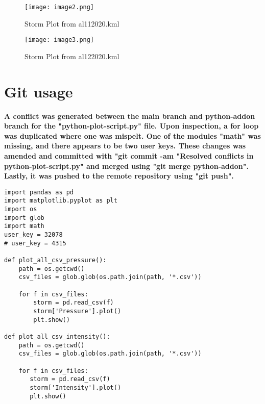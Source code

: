 \documentclass[]{article}
\begin{document}
\newpage

\begin{figure}[!h]
  \centering
  \texttt{[image: image2.png]}
  \caption{Storm Plot from al112020.kml}
  \label{fig:myimage}
\end{figure}

\begin{figure}[!h]
  \centering
  \texttt{[image: image3.png]}
  \caption{Storm Plot from al122020.kml}
  \label{fig:myimage}
\end{figure}

\newpage

\section{Git usage}

\textbf{A conflict was generated between the main branch and python-addon branch for the "python-plot-script.py" file. Upon inspection, a for loop was duplicated where one was mispelt. One of the modules "math" was missing, and there appears to be two user keys. These changes was amended and committed with "git commit -am "Resolved conflicts in python-plot-script.py" and merged using "git merge python-addon". Lastly, it was pushed to the remote repository using "git push".}

\begin{verbatim}
import pandas as pd
import matplotlib.pyplot as plt
import os
import glob
import math
user_key = 32078
# user_key = 4315

def plot_all_csv_pressure():
    path = os.getcwd()
    csv_files = glob.glob(os.path.join(path, '*.csv'))

    for f in csv_files:
        storm = pd.read_csv(f)
        storm['Pressure'].plot()
        plt.show()

def plot_all_csv_intensity():
    path = os.getcwd()
    csv_files = glob.glob(os.path.join(path, '*.csv'))

    for f in csv_files:
       storm = pd.read_csv(f)
       storm['Intensity'].plot()
       plt.show()
\end{verbatim}
\end{document}
